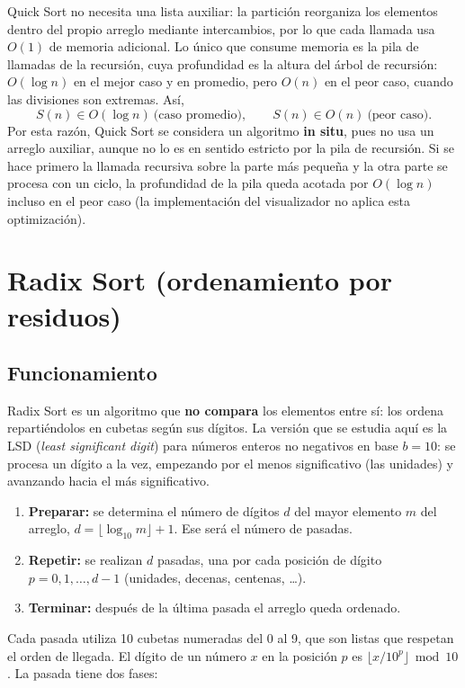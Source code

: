 Quick Sort no necesita una lista auxiliar: la partición reorganiza los elementos dentro del propio arreglo mediante intercambios, por lo que cada llamada usa $O(1)$ de memoria adicional. Lo único que consume memoria es la pila de llamadas de la recursión, cuya profundidad es la altura del árbol de recursión: $O(\log n)$ en el mejor caso y en promedio, pero $O(n)$ en el peor caso, cuando las divisiones son extremas. Así,
\[
  S(n) \in O(\log n) \ \text{(caso promedio)}, \qquad S(n) \in O(n) \ \text{(peor caso)}.
\]
Por esta razón, Quick Sort se considera un algoritmo \textbf{in situ}, pues no usa un arreglo auxiliar, aunque no lo es en sentido estricto por la pila de recursión. Si se hace primero la llamada recursiva sobre la parte más pequeña y la otra parte se procesa con un ciclo, la profundidad de la pila queda acotada por $O(\log n)$ incluso en el peor caso (la implementación del visualizador no aplica esta optimización).

\section{Radix Sort (ordenamiento por residuos)}

\subsection{Funcionamiento}

Radix Sort es un algoritmo que \textbf{no compara} los elementos entre sí: los ordena repartiéndolos en cubetas según sus dígitos. La versión que se estudia aquí es la LSD (\emph{least significant digit}) para números enteros no negativos en base $b = 10$: se procesa un dígito a la vez, empezando por el menos significativo (las unidades) y avanzando hacia el más significativo.

\begin{enumerate}
  \item \textbf{Preparar:} se determina el número de dígitos $d$ del mayor elemento $m$ del arreglo, $d = \lfloor \log_{10} m \rfloor + 1$. Ese será el número de pasadas.
  \item \textbf{Repetir:} se realizan $d$ pasadas, una por cada posición de dígito $p = 0, 1, \dots, d-1$ (unidades, decenas, centenas, \dots).
  \item \textbf{Terminar:} después de la última pasada el arreglo queda ordenado.
\end{enumerate}

Cada pasada utiliza 10 cubetas numeradas del 0 al 9, que son listas que respetan el orden de llegada. El dígito de un número $x$ en la posición $p$ es $\lfloor x / 10^{p} \rfloor \bmod 10$. La pasada tiene dos fases:

